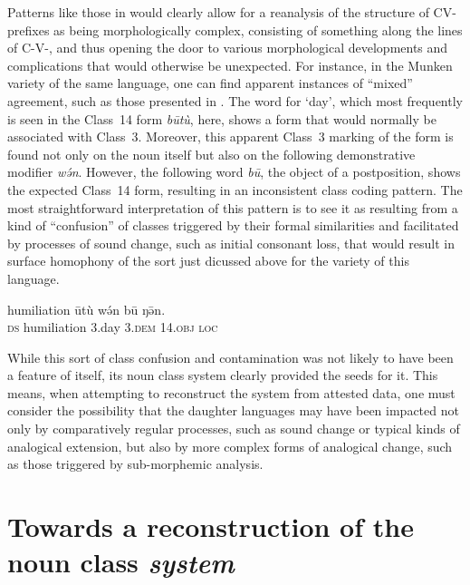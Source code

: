 \documentclass[output=paper ,collection	  ,collectionchapter ,biblatexbackend=biber   ]{langscibook}
\begin{document}
Patterns like those in  would clearly allow for a reanalysis of
the structure of CV- prefixes as being morphologically complex, consisting of
something along the lines of C-V-, and thus opening the door to various
morphological developments and complications that would otherwise be unexpected.
For instance, in the Munken variety of the same language, one can find apparent
instances of ``mixed'' agreement, such as those presented in . The
word for `day', which most frequently is seen in the Class~14 form
\emph{būtù}, here, shows a form that would normally be associated with
Class~3. Moreover, this apparent Class~3 marking of the form is found not only
on the noun itself but also on the following demonstrative modifier
\emph{w\'ən}. However, the following word \emph{bū}, the object of a
postposition, shows the expected Class~14 form, resulting in an inconsistent
class coding pattern. The most straightforward interpretation of this pattern is
to see it as resulting from a kind of ``confusion'' of classes triggered by
their formal similarities and facilitated by processes of sound change, such as
initial consonant loss, that would result in surface homophony of the sort
just dicussed above for the  variety of this language.

\ea
{\label{MunkenDis}
	 {humiliation}  {ūtù}  {w\'ən}  {bū}   {ŋ⁠\=ən}. \\
		 {\scshape{ds}} humiliation 3.day 3.{\scshape{dem}} 14.{\scshape{obj}} {\scshape{loc}} \\
		}
\z

While this sort of class confusion and contamination was not likely to have been
a feature of  itself, its noun class system clearly provided
the seeds for it. This means, when attempting to reconstruct the system from
attested data, one must consider the possibility that the daughter languages may
have been impacted not only by comparatively regular processes, such as sound
change or typical kinds of analogical extension, but also by more complex forms
of analogical change, such as those triggered by sub-morphemic analysis.

\newpage 
\section{Towards a reconstruction of the noun class \emph{system} \label{System}}\label{sec:good:7}
\end{document}
